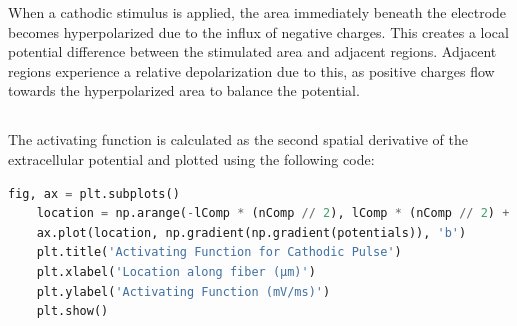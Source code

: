 \documentclass{article}
\begin{document}
    \vspace{10pt}
    When a cathodic stimulus is applied, the area immediately beneath the electrode becomes hyperpolarized due to the influx of negative charges.
    This creates a local potential difference between the stimulated area and adjacent regions.
    Adjacent regions experience a relative depolarization due to this, as positive charges flow towards the hyperpolarized area to balance the potential.

    \subsection{}
    The activating function is calculated as the second spatial derivative of the extracellular potential and plotted using the following code:

    \begin{lstlisting}[language=Python, style=mystyle]
    fig, ax = plt.subplots()
    location = np.arange(-lComp * (nComp // 2), lComp * (nComp // 2) + 1, lComp)
    ax.plot(location, np.gradient(np.gradient(potentials)), 'b')
    plt.title('Activating Function for Cathodic Pulse')
    plt.xlabel('Location along fiber (μm)')
    plt.ylabel('Activating Function (mV/ms)')
    plt.show()
    \end{lstlisting}
\end{document}

